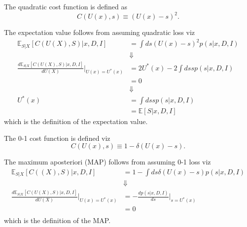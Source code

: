 \begin{definition}
	\label{def:quadratic_cost}
	The quadratic cost function is defined as
	\begin{equation}
		C(U(x),s) \equiv (U(x)-s)^2.
	\end{equation}
\end{definition}

\begin{theorem}
	\label{theorem:expectation_cost}
	The expectation value follows from assuming quadratic loss viz
	\begin{equation}
		\begin{split}
			\mathbb{E}_{S|X}[C(U(X), S)|x,D,I] &= \int ds (U(x)-s)^2 p(s|x,D,I)\\
			&\Downarrow\\
			\frac{d \mathbb{E}_{S|X}[C(U(X), S)|x,D,I]}{dU(X)}\bigg|_{U(x)=U^*(x)} &= 2U^*(x)-2\int ds sp(s|x,D,I)\\
			&=0\\
			&\Downarrow\\
			U^*(x)& = \int ds sp(s|x,D,I)\\
			&= \mathbb{E}[S|x,D,I]
		\end{split}
	\end{equation}
	which is the definition of the expectation value.
\end{theorem}

\begin{definition}
	\label{def:0_1_cost_function}
	The 0-1 cost function is defined viz
	\begin{equation}
		C(U(x),s) \equiv 1-\delta(U(x)-s).
	\end{equation}
\end{definition}

\begin{theorem}[MAP]
	\label{theorem:MAP}
	The maximum aposteriori (MAP) follows from assuming 0-1 loss viz
	\begin{equation}
		\begin{split}
			\mathbb{E}_{S|X}[C((X), S)|x,D,I] &= 1-\int ds \delta(U(x)-s) p(s|x,D,I)\\
			&\Downarrow\\
			\frac{d \mathbb{E}_{S|X}[C(U(X), S)|x,D,I]}{dU(X)}\bigg|_{U(x)=U^*(x)} &= -\frac{dp(s|x,D,I)}{ds}\bigg|_{s=U^*(x)}\\
			&=0\\
		\end{split}
	\end{equation}
	which is the definition of the MAP.
\end{theorem}

